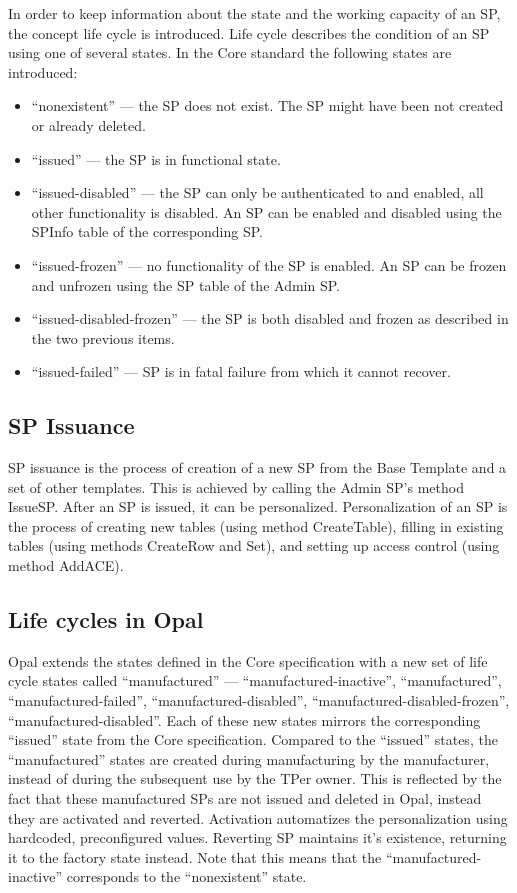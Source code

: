 In order to keep information about the state and the working capacity of an SP, the concept life cycle is introduced. Life cycle describes the condition of an SP using one of several states. In the Core standard the following states are introduced: 
\begin{itemize}
\item ``nonexistent'' --- the SP does not exist. The SP might have been not created or already deleted.
\item ``issued'' --- the SP is in functional state.
\item ``issued-disabled'' --- the SP can only be authenticated to and enabled, all other functionality is disabled. An SP can be enabled and disabled using the SPInfo table of the corresponding SP.
\item ``issued-frozen'' --- no functionality of the SP is enabled. An SP can be frozen and unfrozen using the SP table of the Admin SP.
\item ``issued-disabled-frozen'' --- the SP is both disabled and frozen as described in the two previous items.
\item ``issued-failed'' --- SP is in fatal failure from which it cannot recover.
\end{itemize}

\subsection{SP Issuance}

SP issuance is the process of creation of a new SP from the Base Template and a set of other templates. This is achieved by calling the Admin SP's method IssueSP. After an SP is issued, it can be personalized. Personalization of an SP is the process of creating new tables (using method CreateTable), filling in existing tables (using methods CreateRow and Set), and setting up access control (using method AddACE).

\subsection{Life cycles in Opal}

Opal extends the states defined in the Core specification with a new set of life cycle states called ``manufactured'' --- ``manufactured-inactive'', ``manufactured'', ``manufactured-failed'', ``manufactured-disabled'', ``manufactured-disabled-frozen'', ``manufactured-disabled''. Each of these new states mirrors the corresponding ``issued'' state from the Core specification. Compared to the ``issued'' states, the ``manufactured'' states are created during manufacturing by the manufacturer, instead of during the subsequent use by the TPer owner. This is reflected by the fact that these manufactured SPs are not issued and deleted in Opal, instead they are activated and reverted. Activation automatizes the personalization using hardcoded, preconfigured values. Reverting SP maintains it's existence, returning it to the factory state instead. Note that this means that the ``manufactured-inactive'' corresponds to the ``nonexistent'' state.

